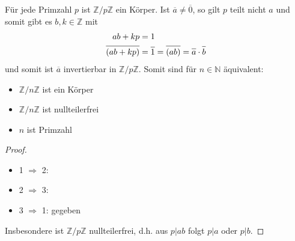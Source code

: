 \begin{example}
	Für jede Primzahl $p$ ist $\mathbb Z /p \mathbb Z$ ein Körper. Ist $\overline{a}\neq \overline{0}$, so gilt 
	$p$ teilt nicht $a$ und somit gibt es $b,k \in \mathbb Z$ mit \\
	\begin{align}
		ab+kp &= 1 \notag \\
		\overline{(ab+kp)} &= \overline{1} = \overline{(ab)} = \overline{a} \cdot \overline{b} \notag
	\end{align}
	und somit ist $\overline{a}$ invertierbar in $\mathbb Z /p \mathbb Z$. Somit sind für $n \in \mathbb N$
	äquivalent:
	\begin{itemize}
		\item $\mathbb Z /n \mathbb Z$ ist ein Körper
		\item $\mathbb Z /n \mathbb Z$ ist nullteilerfrei
		\item $n$ ist Primzahl
	\end{itemize}
\end{example}
\begin{proof}
	\begin{itemize}
		\item 1 $\Rightarrow$ 2: 
		\item 2 $\Rightarrow$ 3: 
		\item 3 $\Rightarrow$ 1: gegeben
	\end{itemize}
	Insbesondere ist $\mathbb Z /p \mathbb Z$ nullteilerfrei, d.h. aus $p\vert ab$ folgt $p\vert a$ oder $p\vert b$.
\end{proof}
